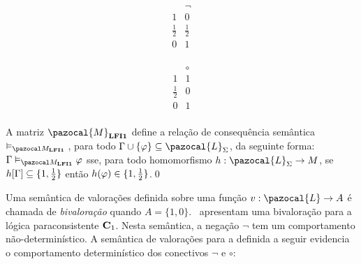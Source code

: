 \begin{definicao}
            \vspace{0.5cm}

            \begin{minipage}{0.5\textwidth}
                \[
                    \begin{array}{c|c}%
                                    & \neg        \\
                        \hline%
                        1           & 0           \\
                        \frac{1}{2} & \frac{1}{2} \\
                        0           & 1           \\
                    \end{array}
                \]
            \end{minipage}
            \begin{minipage}{0.3\textwidth}
                \[
                    \begin{array}{c|c}%
                                    & \circ   \\
                        \hline%
                        1           & 1         \\
                        \frac{1}{2} & 0         \\
                        0           & 1         \\
                    \end{array}
                \]
            \end{minipage}

            \noindent
            A matriz $\pazocal{M}_{\lfium{}}$ define a relação de consequência semântica $\conmat{}$, para todo $\Gamma \cup \{\phi\} \subseteq \pazocal{L}_{\Sigma}$, da seguinte forma: $\Gamma \conmat \phi$ sse, para todo homomorfismo $h : \pazocal{L}_{\Sigma} \to M$, se $h[\Gamma] \subseteq \{1, \frac{1}{2}{}\}$ então $h(\varphi) \in \{1, \frac{1}{2}{}\}$.\qed{}
        \end{definicao}
        
        

        Uma semântica de valorações definida sobre uma função $v : \pazocal{L} \to A$ é chamada de \textit{bivaloração} quando $A = \{1, 0\}$.~ apresentam uma bivaloração para a lógica paraconsistente $\text{\textbf{C}}_{1}$. Nesta semântica, a negação $\neg$ tem um comportamento não-determinístico. A semântica de valorações para a \lfium{} definida a seguir evidencia o comportamento determinístico dos conectivos $\neg$ e $\circ$:

